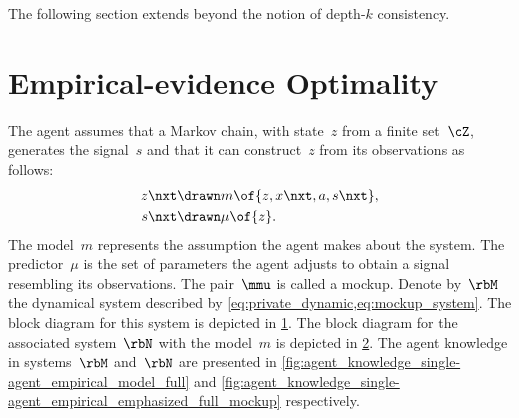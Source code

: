 The following section extends beyond the notion of depth-\(k\) consistency.

\section{Empirical-evidence Optimality}
\label{sec:empirical_evidence_optimality}

The agent assumes that a Markov chain, with state~\(z\) from a finite set~\(\cZ\), generates the signal~\(s\) and that it can construct~\(z\) from its observations as follows:
\begin{subequations}
\label{eq:mockup_system}
\begin{align}
\label{eq:mockup_model}
z\nxt &\drawn m \of{z, x\nxt, a, s\nxt}, \\
\label{eq:mockup_predictor}
s\nxt &\drawn \mu \of{z}.
\end{align}
\end{subequations}
The model~\(m\) represents the assumption the agent makes about the system.
The predictor~\(\mu\) is the set of parameters the agent adjusts to obtain a signal resembling its observations.
The pair~\(\mmu\) is called a mockup.
Denote by~\(\rbM\) the dynamical system described by \cref{eq:private_dynamic,eq:mockup_system}.
The block diagram for this system is depicted in \cref{fig:block_diagram_single-agent_full_mockup_with_strategy}.
The block diagram for the associated system~\(\rbN\) with the model~\(m\) is depicted in \cref{fig:block_diagram_single-agent_problem_with_full_mockup_and_strategy}.
The agent knowledge in systems~\(\rbM\) and~\(\rbN\) are presented in \cref{fig:agent_knowledge_single-agent_empirical_model_full} and \cref{fig:agent_knowledge_single-agent_empirical_emphasized_full_mockup} respectively.

\begin{figure}[htp]
\centering
{}
\label{fig:block_diagram_single-agent_full_mockup_with_strategy}
\end{figure}

\begin{figure}[htp]
\centering
{}
\label{fig:block_diagram_single-agent_problem_with_full_mockup_and_strategy}
\end{figure}

